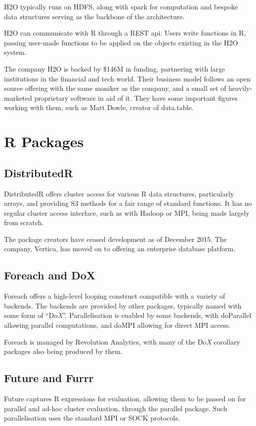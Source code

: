 \documentclass[10pt,a4paper]{article}
\begin{document}
H2O typically runs on HDFS, along with spark for computation and
bespoke data structures serving as the backbone of the architecture.

H2O can communicate with R through a REST api. Users write functions
in R, passing user-made functions to be applied on the objects
existing in the H2O system.

The company H2O is backed by \$146M in funding, partnering with large
institutions in the financial and tech world. Their business model
follows an open source offering with the same moniker as the company,
and a small set of heavily-marketed proprietary software in aid of it.
They have some important figures working with them, such as Matt
Dowle, creator of data.table.

\section{R Packages}
\label{sec:r-packages}

\subsection{DistributedR}
\label{sec:distributedr}
DistributedR offers cluster access for various R data structures,
particularly arrays, and providing S3 methods for a fair range of
standard functions. It has no regular cluster access interface, such
as with Hadoop or MPI, being made largely from scratch.

The package creators have ceased development as of December 2015. The
company, Vertica, has moved on to offering an enterprise database
platform.

\subsection{Foreach and DoX}
\label{sec:foreach-dox}
\nocite{microsoft20}
\nocite{corporation19}
\nocite{dosnow19}
\nocite{weston17}
Foreach offers a high-level looping construct compatible with a
variety of backends. The backends are provided by other packages,
typically named with some form of ``Do\textit{X}''. Parallelisation is
enabled by some backends, with doParallel allowing parallel
computations, and doMPI allowing for direct MPI access.

Foreach is managed by Revolution Analytics, with many of the
Do\textit{X} corollary packages also being produced by them.

\subsection{Future and Furrr}
\label{sec:future-furrr}
\nocite{bengtsson20}
\nocite{vaughan18}
Future captures R expressions for evaluation, allowing them to be
passed on for parallel and ad-hoc cluster evaluation, through the
parallel package. Such parallelisation uses the standard MPI or SOCK
protocols.
\end{document}
